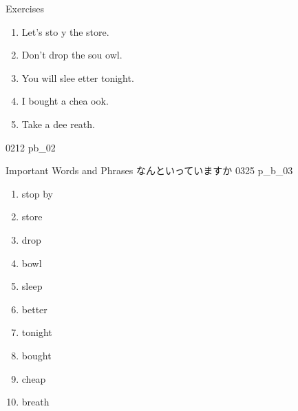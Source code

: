 \documentclass[aspectratio=169,xcolor={dvipsnames,table}]{beamer}
\begin{document}
\begin{frame}[plain]{Exercises }
  \Large
  \begin{enumerate}
    \item<2-> Let's sto  y the store.
    \item<4-> Don't drop the sou  owl.
    \item<6-> You will slee  etter tonight.
    \item<8-> I bought  a chea  ook.
    \item<10-> Take  a dee  reath.
  \end{enumerate}

  \hfill{\tiny 0212}\,{\scriptsize {}\,pb\_02}

\end{frame}
\begin{frame}[plain,t]{Important Words and Phrases}
  なんといっていますか%
  \hfill{\tiny 0325}\,{\scriptsize {}\,p\_b\_03}\pause
  \vspace{-8pt}
  \Large
  \begin{enumerate}[<+- |alert@+>]\setlength{\itemsep}{-1.8pt}
    \item stop by%
    \item store
    \item drop
    \item bowl
    \item sleep
    \item better
    \item tonight
    \item bought
    \item cheap
    \item breath
  \end{enumerate}

\end{frame}
\end{document}
